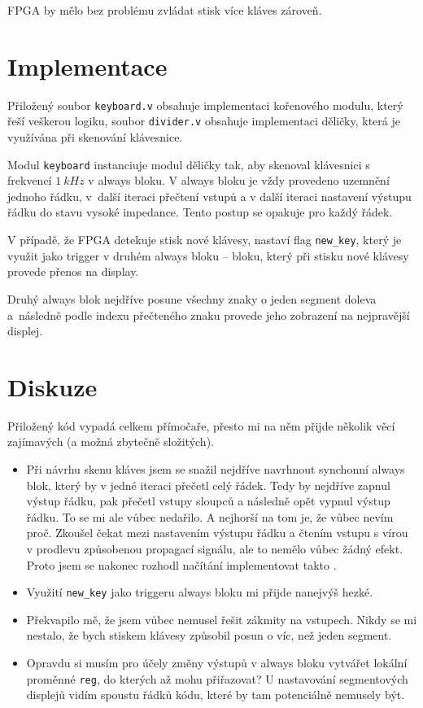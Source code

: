 \documentclass[12pt,a4paper]{article}
\begin{document}
FPGA by mělo bez problému zvládat stisk více kláves zároveň.

\section{Implementace}

Přiložený soubor \texttt{keyboard.v} obsahuje implementaci kořenového
modulu, který řeší veškerou logiku, soubor \texttt{divider.v} obsahuje
implementaci děličky, která je využívána při skenování klávesnice.

Modul \texttt{keyboard} instanciuje modul děličky tak, aby skenoval
klávesnici s frekvencí $1\ kHz$ v always bloku. V always bloku je vždy
provedeno uzemnění jednoho řádku, v~další iteraci přečtení vstupů a v další
iteraci nastavení výstupu řádku do stavu vysoké impedance. Tento postup se
opakuje pro každý řádek.

V případě, že FPGA detekuje stisk nové klávesy, nastaví flag \texttt{new\_key}, který je využit jako trigger v druhém always bloku --
bloku, který při stisku nové klávesy provede přenos na display.

Druhý always blok nejdříve posune všechny znaky o jeden segment doleva a~následně podle indexu přečteného znaku provede jeho zobrazení na
nejpravější displej.

\section{Diskuze}

Přiložený kód vypadá celkem přímočaře, přesto mi na něm přijde několik věcí
zajímavých (a možná zbytečně složitých).

\begin{itemize}
	\item Při návrhu skenu kláves jsem se snažil nejdříve navrhnout synchonní always blok, který by v jedné iteraci přečetl celý řádek. Tedy by nejdříve zapnul výstup řádku, pak přečetl vstupy sloupců a následně opět vypnul výstup řádku. To se mi ale vůbec nedařilo. A nejhorší na tom je, že vůbec nevím proč. Zkoušel čekat mezi nastavením výstupu řádku a čtením vstupu s vírou v prodlevu způsobenou propagací signálu, ale to nemělo vůbec žádný efekt. Proto jsem se nakonec rozhodl načítání implementovat takto .
	\item Využití \texttt{new\_key} jako triggeru always bloku mi přijde nanejvýš hezké.
	\item Překvapilo mě, že jsem vůbec nemusel řešit zákmity na vstupech. Nikdy se mi nestalo, že bych stiskem klávesy způsobil posun o víc, než jeden segment.
	\item Opravdu si musím pro účely změny výstupů v always bloku vytvářet lokální proměnné \texttt{reg}, do kterých až mohu přiřazovat? U nastavování segmentových displejů vidím spoustu řádků kódu, které by tam potenciálně nemusely být.
\end{itemize}
\end{document}
